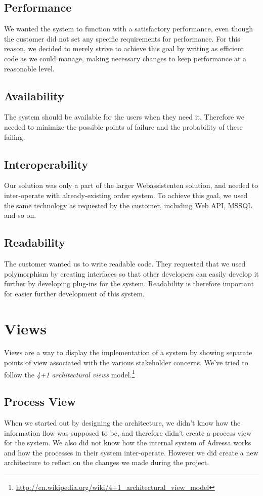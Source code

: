 \subsection{Performance}
We wanted the system to function with a satisfactory performance, even though the customer did not set any specific requirements for performance. For this reason, we decided to merely strive to achieve this goal by writing as efficient code as we could manage, making necessary changes to keep performance at a reasonable level. %

\subsection{Availability}
The system should be available for the users when they need it. Therefore we needed to minimize the possible points of failure and the probability of these failing. %

\subsection{Interoperability}
Our solution was only a part of the larger Webassistenten solution, and needed to inter-operate with already-existing order system. To achieve this goal, we used the same technology as requested by the customer, including Web API, MSSQL and so on.

\subsection{Readability}
The customer wanted us to write readable code. They requested that we used polymorphism by creating interfaces so that other developers can easily develop it further by developing plug-ins for the system. Readability is therefore important for easier further development of this system.


\section{Views}
Views are a way to display the implementation of a system by showing separate points of view associated with the various stakeholder concerns. We've tried to follow the \emph{4+1 architectural views} model.\footnote{\href{http://en.wikipedia.org/wiki/4+1_Architectural_View_Model}{http://en.wikipedia.org/wiki/4+1\_architectural\_view\_model}}
\subsection{Process View}
When we started out by designing the architecture, we didn't know how the information flow was supposed to be, and therefore didn't create a process view for the system. We also did not know how the internal system of Adressa works and how the processes in their system inter-operate. However we did create a new architecture to reflect on the changes we made during the project. 

